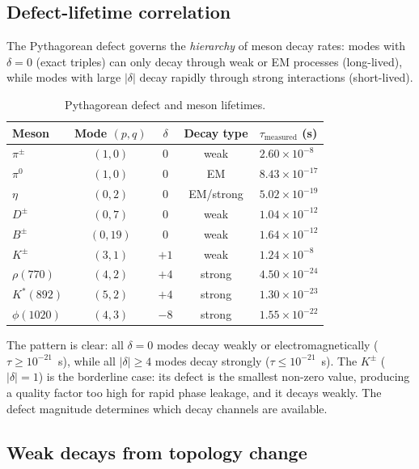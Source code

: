 \documentclass[11pt,a4paper]{article}
\begin{document}
\subsection{Defect-lifetime correlation}

The Pythagorean defect governs the \emph{hierarchy} of meson decay rates: modes with $\delta = 0$ (exact triples) can only decay through weak or EM processes (long-lived), while modes with large $|\delta|$ decay rapidly through strong interactions (short-lived).

\begin{table}[h]
\centering
\caption{Pythagorean defect and meson lifetimes.}
\label{tab:defect}
\small
\begin{tabular}{@{}lcccl@{}}
\toprule
Meson & Mode $(p,q)$ & $\delta$ & Decay type & $\tau_{\text{measured}}$ (s) \\
\midrule
$\pi^\pm$ & $(1,0)$ & 0 & weak & $2.60 \times 10^{-8}$ \\
$\pi^0$ & $(1,0)$ & 0 & EM & $8.43 \times 10^{-17}$ \\
$\eta$ & $(0,2)$ & 0 & EM/strong & $5.02 \times 10^{-19}$ \\
$D^\pm$ & $(0,7)$ & 0 & weak & $1.04 \times 10^{-12}$ \\
$B^\pm$ & $(0,19)$ & 0 & weak & $1.64 \times 10^{-12}$ \\
$K^\pm$ & $(3,1)$ & $+1$ & weak & $1.24 \times 10^{-8}$ \\
$\rho(770)$ & $(4,2)$ & $+4$ & strong & $4.50 \times 10^{-24}$ \\
$K^*(892)$ & $(5,2)$ & $+4$ & strong & $1.30 \times 10^{-23}$ \\
$\phi(1020)$ & $(4,3)$ & $-8$ & strong & $1.55 \times 10^{-22}$ \\
\bottomrule
\end{tabular}
\end{table}

The pattern is clear: all $\delta = 0$ modes decay weakly or electromagnetically ($\tau \geq 10^{-21}$~s), while all $|\delta| \geq 4$ modes decay strongly ($\tau \leq 10^{-21}$~s). The $K^\pm$ ($|\delta| = 1$) is the borderline case: its defect is the smallest non-zero value, producing a quality factor too high for rapid phase leakage, and it decays weakly. The defect magnitude determines which decay channels are available.

\subsection{Weak decays from topology change}
\end{document}
